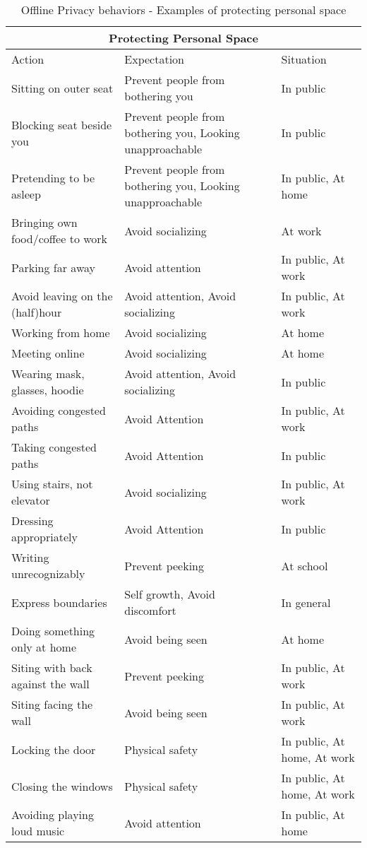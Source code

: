 \begin{table}[H]
    \centering
\begin{tabular}{ |p{5cm}||p{6cm}|p{4cm}|  }
\hline
\multicolumn{3}{|c|}{Protecting Personal Space} \\
\hline
\hline
    Action & Expectation & Situation\\
\hline
\hline
    Sitting on outer seat & Prevent people from bothering you & In public \\
\hline
    Blocking seat beside you & Prevent people from bothering you, Looking unapproachable & In public \\
\hline
    Pretending to be asleep & Prevent people from bothering you, Looking unapproachable  & In public, At home \\
\hline
    Bringing own food/coffee to work & Avoid socializing & At work \\
\hline
    Parking far away & Avoid attention & In public, At work \\
\hline
    Avoid leaving on the (half)hour & Avoid attention, Avoid socializing & In public, At work \\
\hline
    Working from home & Avoid socializing & At home \\
\hline
    Meeting online & Avoid socializing & At home \\
\hline
    Wearing mask, glasses, hoodie & Avoid attention, Avoid socializing & In public \\
\hline
    Avoiding congested paths & Avoid Attention & In public, At work \\
\hline
    Taking congested paths & Avoid Attention & In public \\
\hline
    Using stairs, not elevator & Avoid socializing & In public, At work \\
\hline
    Dressing appropriately & Avoid Attention & In public \\
\hline
    Writing unrecognizably & Prevent peeking & At school \\
\hline
    Express boundaries & Self growth, Avoid discomfort & In general \\
\hline
    Doing something only at home & Avoid being seen  & At home \\
\hline
    Siting with back against the wall & Prevent peeking & In public, At work \\
\hline
    Siting facing the wall & Avoid being seen & In public, At work \\
\hline
    Locking the door & Physical safety & In public, At home, At work \\
\hline
    Closing the windows & Physical safety & In public, At home, At work \\
\hline
    Avoiding playing loud music & Avoid attention  & In public, At home \\
\hline

\end{tabular}
\caption{Offline Privacy behaviors - Examples of protecting personal space}
    \label{tab:meng_t1}
\end{table}



